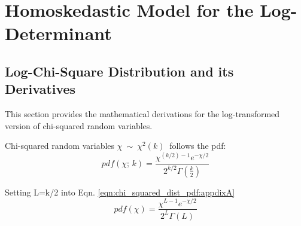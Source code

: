 \documentclass[journal]{IEEEtran}
\begin{document}
 

\appendices
\section{Homoskedastic Model for the Log-Determinant}
\label{chap:appendix_a}

\subsection{Log-Chi-Square Distribution and its Derivatives}
\renewcommand{\theequation}{\thesection.\arabic{equation}}
\setcounter{equation}{0}

This section provides the mathematical derivations for the log-transformed version of chi-squared random variables.

Chi-squared random variables $\chi\ \sim\ \chi^2(k)\ $ follows the pdf:
\begin{equation}
pdf(\chi;\,k) =
  \frac{\chi^{(k/2)-1} e^{-\chi/2}}{2^{k/2} \Gamma\left(\frac{k}{2}\right)}  
\label{eqn:chi_squared_dist_pdf:appdixA}
\end{equation}

Setting L=k/2 into Eqn. \ref{eqn:chi_squared_dist_pdf:appdixA}
\begin{equation}
pdf(\chi) = \frac{\chi^{L-1}e^{-\chi/2}}{2^L\Gamma(L)}
\end{equation}
\end{document}
